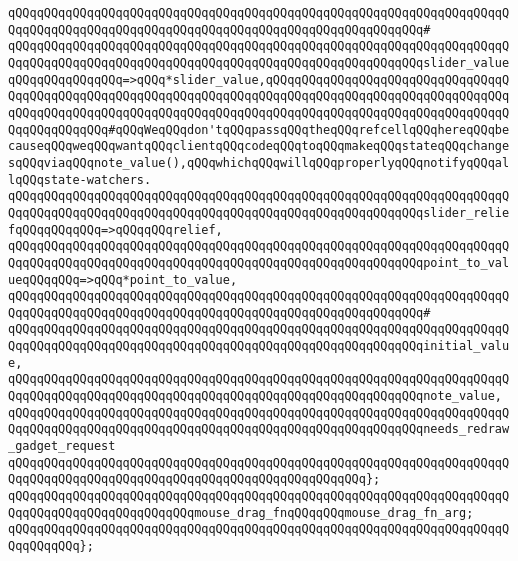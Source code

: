\verb|qQQqqQQqqQQqqQQqqQQqqQQqqQQqqQQqqQQqqQQqqQQqqQQqqQQqqQQqqQQqqQQqqQQqqQQqqQQqqQQqqQQqqQQqqQQqqQQqqQQqqQQqqQQqqQQqqQQqqQQqqQQqqQQq#|\newline
\verb|qQQqqQQqqQQqqQQqqQQqqQQqqQQqqQQqqQQqqQQqqQQqqQQqqQQqqQQqqQQqqQQqqQQqqQQqqQQqqQQqqQQqqQQqqQQqqQQqqQQqqQQqqQQqqQQqqQQqqQQqqQQqqQQqslider_valueqQQqqQQqqQQqqQQq=>qQQq*slider_value,qQQqqQQqqQQqqQQqqQQqqQQqqQQqqQQqqQQqqQQqqQQqqQQqqQQqqQQqqQQqqQQqqQQqqQQqqQQqqQQqqQQqqQQqqQQqqQQqqQQqqQQqqQQqqQQqqQQqqQQqqQQqqQQqqQQqqQQqqQQqqQQqqQQqqQQqqQQqqQQqqQQqqQQqqQQqqQQqqQQqqQQqqQQq#qQQqWeqQQqdon'tqQQqpassqQQqtheqQQqrefcellqQQqhereqQQqbecauseqQQqweqQQqwantqQQqclientqQQqcodeqQQqtoqQQqmakeqQQqstateqQQqchangesqQQqviaqQQqnote_value(),qQQqwhichqQQqwillqQQqproperlyqQQqnotifyqQQqallqQQqstate-watchers.|\newline
\verb|qQQqqQQqqQQqqQQqqQQqqQQqqQQqqQQqqQQqqQQqqQQqqQQqqQQqqQQqqQQqqQQqqQQqqQQqqQQqqQQqqQQqqQQqqQQqqQQqqQQqqQQqqQQqqQQqqQQqqQQqqQQqqQQqslider_reliefqQQqqQQqqQQq=>qQQqqQQqrelief,|\newline
\verb|qQQqqQQqqQQqqQQqqQQqqQQqqQQqqQQqqQQqqQQqqQQqqQQqqQQqqQQqqQQqqQQqqQQqqQQqqQQqqQQqqQQqqQQqqQQqqQQqqQQqqQQqqQQqqQQqqQQqqQQqqQQqqQQqpoint_to_valueqQQqqQQq=>qQQq*point_to_value,|\newline
\verb|qQQqqQQqqQQqqQQqqQQqqQQqqQQqqQQqqQQqqQQqqQQqqQQqqQQqqQQqqQQqqQQqqQQqqQQqqQQqqQQqqQQqqQQqqQQqqQQqqQQqqQQqqQQqqQQqqQQqqQQqqQQqqQQq#|\newline
\verb|qQQqqQQqqQQqqQQqqQQqqQQqqQQqqQQqqQQqqQQqqQQqqQQqqQQqqQQqqQQqqQQqqQQqqQQqqQQqqQQqqQQqqQQqqQQqqQQqqQQqqQQqqQQqqQQqqQQqqQQqqQQqqQQqinitial_value,|\newline
\verb|qQQqqQQqqQQqqQQqqQQqqQQqqQQqqQQqqQQqqQQqqQQqqQQqqQQqqQQqqQQqqQQqqQQqqQQqqQQqqQQqqQQqqQQqqQQqqQQqqQQqqQQqqQQqqQQqqQQqqQQqqQQqqQQqnote_value,|\newline
\verb|qQQqqQQqqQQqqQQqqQQqqQQqqQQqqQQqqQQqqQQqqQQqqQQqqQQqqQQqqQQqqQQqqQQqqQQqqQQqqQQqqQQqqQQqqQQqqQQqqQQqqQQqqQQqqQQqqQQqqQQqqQQqqQQqneeds_redraw_gadget_request|\newline
\verb|qQQqqQQqqQQqqQQqqQQqqQQqqQQqqQQqqQQqqQQqqQQqqQQqqQQqqQQqqQQqqQQqqQQqqQQqqQQqqQQqqQQqqQQqqQQqqQQqqQQqqQQqqQQqqQQqqQQqqQQq};|\newline
\newline
\verb|qQQqqQQqqQQqqQQqqQQqqQQqqQQqqQQqqQQqqQQqqQQqqQQqqQQqqQQqqQQqqQQqqQQqqQQqqQQqqQQqqQQqqQQqqQQqqQQqmouse_drag_fnqQQqqQQqmouse_drag_fn_arg;|\newline
\verb|qQQqqQQqqQQqqQQqqQQqqQQqqQQqqQQqqQQqqQQqqQQqqQQqqQQqqQQqqQQqqQQqqQQqqQQqqQQqqQQq};|\newline
